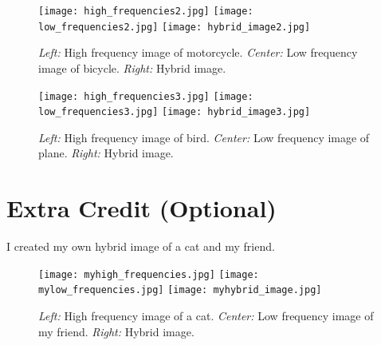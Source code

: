 \begin{figure} [h]
    \centering
    \texttt{[image: high\_frequencies2.jpg]}
    \texttt{[image: low\_frequencies2.jpg]}
    \texttt{[image: hybrid\_image2.jpg]}
    \caption{\emph{Left:} High frequency image of motorcycle. \emph{Center:} Low frequency image of bicycle. \emph{Right:} Hybrid image.}
\end{figure}

\begin{figure} [h]
    \centering
    \texttt{[image: high\_frequencies3.jpg]}
    \texttt{[image: low\_frequencies3.jpg]}
    \texttt{[image: hybrid\_image3.jpg]}
    \caption{\emph{Left:} High frequency image of bird. \emph{Center:} Low frequency image of plane. \emph{Right:} Hybrid image.}
\end{figure}

\section*{Extra Credit (Optional)}
I created my own hybrid image of a cat and my friend. 
\begin{figure} [t]
    \centering
    \texttt{[image: myhigh\_frequencies.jpg]}
    \texttt{[image: mylow\_frequencies.jpg]}
    \texttt{[image: myhybrid\_image.jpg]}
    \caption{\emph{Left:} High frequency image of a cat. \emph{Center:} Low frequency image of my friend. \emph{Right:} Hybrid image.}
\end{figure}



